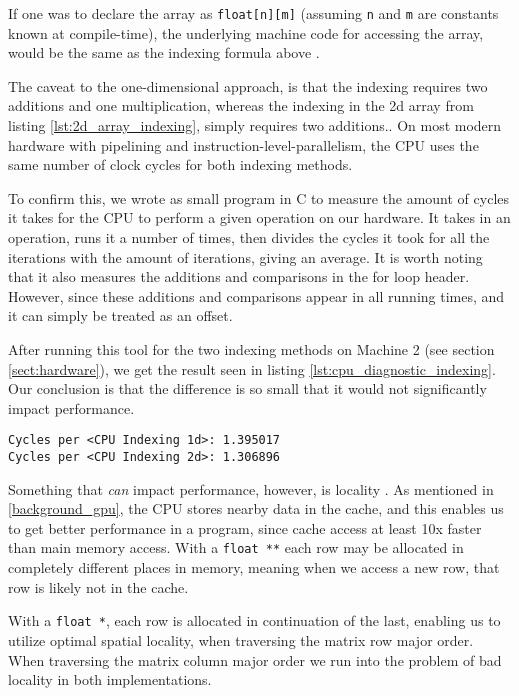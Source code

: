 If one was to declare the array as \texttt{float[n][m]} (assuming \texttt{n} and \texttt{m} are constants known at compile-time), the underlying machine code for accessing the array, would be the same as the indexing formula above \cite[Ch. 1.2]{numericalrecipes}.

The caveat to the one-dimensional approach, is that the indexing requires two additions and one multiplication, whereas the indexing in the 2d array from listing \ref{lst:2d_array_indexing}, simply requires two additions.\cite{numericalrecipes}. On most modern hardware with pipelining and instruction-level-parallelism, the CPU uses the same number of clock cycles for both indexing methods.

To confirm this, we wrote as small program in C to measure the amount of cycles it takes for the CPU to perform a given operation on our hardware. It takes in an operation, runs it a number of times, then divides the cycles it took for all the iterations with the amount of iterations, giving an average. It is worth noting that it also measures the additions and comparisons in the for loop header. However, since these additions and comparisons appear in all running times, and it can simply be treated as an offset.

After running this tool for the two indexing methods on Machine 2 (see section \ref{sect:hardware}), we get the result seen in listing \ref{lst:cpu_diagnostic_indexing}. Our conclusion is that the difference is so small that it would not significantly impact performance.

\begin{lstlisting}[caption={CPU Diagnostic for indexing methods.}, label={lst:cpu_diagnostic_indexing}]
Cycles per <CPU Indexing 1d>: 1.395017
Cycles per <CPU Indexing 2d>: 1.306896
\end{lstlisting}

Something that \textit{can} impact performance, however, is locality \cite[Sect. 6.2]{computersystems}. As mentioned in \ref{background_gpu}, the CPU stores nearby data in the cache, and this enables us to get better performance in a program, since cache access at least 10x faster than main memory access. With a \texttt{float **} each row may be allocated in completely different places in memory, meaning when we access a new row, that row is likely not in the cache.

With a \texttt{float *}, each row is allocated in continuation of the last, enabling us to utilize optimal spatial locality, when traversing the matrix row major order. When traversing the matrix column major order we run into the problem of bad locality in both implementations.\\

